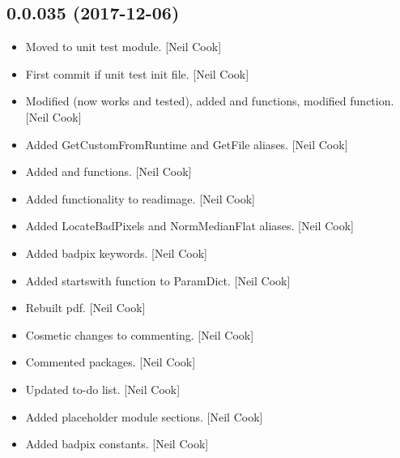 \documentclass[a4paper,10pt,english]{report}
\begin{document}
\subsection{0.0.035 (2017-12-06)}
\label{\detokenize{misc/changelog:id516}}\begin{itemize}
\item {} 
Moved  to unit test module. {[}Neil Cook{]}

\item {} 
First commit if unit test init file. {[}Neil Cook{]}

\item {} 
Modified  (now works and tested), added
 and  functions, modified
 function. {[}Neil Cook{]}

\item {} 
Added GetCustomFromRuntime and GetFile aliases. {[}Neil Cook{]}

\item {} 
Added  and  functions. {[}Neil
Cook{]}

\item {} 
Added functionality to readimage. {[}Neil Cook{]}

\item {} 
Added LocateBadPixels and NormMedianFlat aliases. {[}Neil Cook{]}

\item {} 
Added badpix keywords. {[}Neil Cook{]}

\item {} 
Added startswith function to ParamDict. {[}Neil Cook{]}

\item {} 
Rebuilt pdf. {[}Neil Cook{]}

\item {} 
Cosmetic changes to commenting. {[}Neil Cook{]}

\item {} 
Commented packages. {[}Neil Cook{]}

\item {} 
Updated to-do list. {[}Neil Cook{]}

\item {} 
Added placeholder module sections. {[}Neil Cook{]}

\item {} 
Added badpix constants. {[}Neil Cook{]}


\end{itemize}
\end{document}
